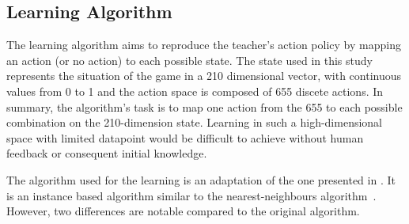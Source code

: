 

\subsection{Learning Algorithm} \label{sec:tuto_algo}
The learning algorithm aims to reproduce the teacher's action policy by mapping an action (or no action) to each possible state. The state used in this study represents the situation of the game in a 210 dimensional vector, with continuous values from 0 to 1 and the action space is composed of 655 discete actions. In summary, the algorithm's task is to map one action from the 655 to each possible combination on the 210-dimension state. Learning in such a high-dimensional space with limited datapoint would be difficult to achieve without human feedback or consequent initial knowledge.

The algorithm used for the learning is an adaptation of the one presented in \cite{senft2017toward}. It is an instance based algorithm similar to the nearest-neighbours algorithm~\citep{cover1967nearest}. However, two differences are notable compared to the original algorithm. %

